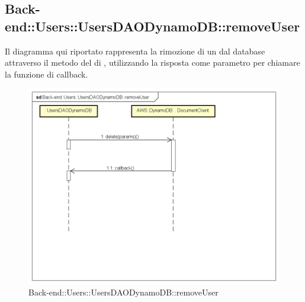 \subsection{Back-end::Users::UsersDAODynamoDB::removeUser}
Il diagramma qui riportato rappresenta la rimozione di un  dal database attraverso il metodo  del  di , utilizzando la risposta come parametro per chiamare la funzione di callback.
 \begin{figure}[h] \centering \includegraphics[width=\textwidth,height=\textheight,keepaspectratio]{images/diagrams/back-end/Ufficial_Backend/Back-endUsersUsersDAODynamoDBremoveUser.png} 	\caption{Back-end::Users::UsersDAODynamoDB::removeUser}
\end{figure}
\newpage

